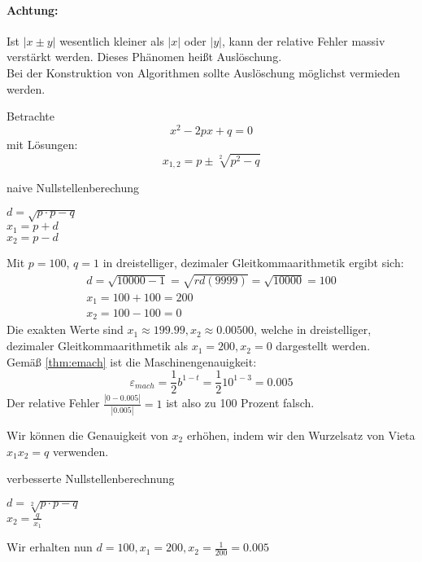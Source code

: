 \paragraph{Achtung:} Ist $|x \pm y|$ wesentlich kleiner als $|x|$ oder $|y|$, kann der relative Fehler massiv verstärkt werden. 
Dieses Phänomen heißt Auslöschung.\\
Bei der Konstruktion von Algorithmen sollte Auslöschung möglichst vermieden werden.
\begin{example}\label{eg:pq}
Betrachte \\
\begin{equation}
\label{eqn:pq}
x^2-2px+q=0
\end{equation}
mit Lösungen:
\[
x_{1,2} = p \pm \sqrt[2]{p^2-q} 
\]


\begin{algorithm}[H]
 \label{alg:nst1}
 \caption{naive Nullstellenberechung}
 $d=\sqrt{p\cdot p -q}$ \\
 $x_1= p+d$ \\
 $x_2= p-d$
 \end{algorithm}
 Mit $p=100$, $q=1$ in dreistelliger, dezimaler Gleitkommaarithmetik ergibt sich:
 \begin{equation*}
	 \begin{split}
		 d= \sqrt{10000-1}= \sqrt{rd(9999)}=\sqrt{10000} = 100 \\
		 x_1=100+100=200 \\
		 x_2= 100-100 =0
	 \end{split}
 \end{equation*}
Die exakten Werte sind  $x_1 \approx 199.99, x_2 \approx 0.00500$, welche in dreistelliger, dezimaler Gleitkommaarithmetik als $x_1=200,x_2=0$ dargestellt werden. \\
Gemäß \ref{thm:emach} ist die Maschinengenauigkeit:
\[
\varepsilon_{mach} = \frac{1}{2}b^{1-t}= \frac{1}{2}10^{1-3}=0.005
\]
Der relative Fehler $\frac{|0-0.005|}{|0.005|}=1$ ist also zu 100 Prozent falsch.
\end{example}
Wir können die Genauigkeit von $x_2$ erhöhen, indem wir den Wurzelsatz von Vieta $x_1x_2=q$ verwenden.\\
\begin{algorithm}[H]
 \caption{verbesserte Nullstellenberechnung}
 $d= \sqrt[2]{p \cdot p -q}$ \\
 $x_2=\frac{q}{x_1}$
 \end{algorithm}
 Wir erhalten nun $d=100, x_1=200,x_2=\frac{1}{200}=0.005$
